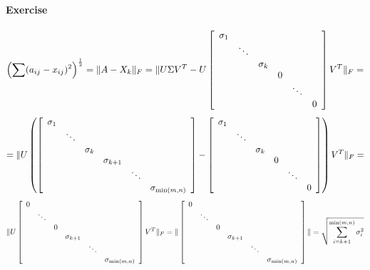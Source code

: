 \documentclass[10pt]{report}
\begin{document}
\paragraph{Exercise}
$$\left(\sum(a_{ij}-x_{ij})^2\right)^{\frac{1}{2}} = \|A-X_k\|_F=\|U\Sigma V^T-U\left[\begin{array}{c c c c c c}
\sigma_1\\
&\ddots\\
&&\sigma_k\\
&&&0\\
&&&&\ddots\\
&&&&&0
\end{array}\right]V^T\|_F=$$
$$=\|U\left(\left[\begin{array}{c c c c c c}
\sigma_1\\
&\ddots\\
&&\sigma_k\\
&&&\sigma_{k+1}\\
&&&&\ddots\\
&&&&&\sigma_{\min(m,n)}
\end{array}\right]-\left[\begin{array}{c c c c c c}
\sigma_1\\
&\ddots\\
&&\sigma_k\\
&&&0\\
&&&&\ddots\\
&&&&&0
\end{array}\right]\right)V^T\|_F=$$
$$\|U\left[\begin{array}{c c c c c c}
0\\
&\ddots\\
&&0\\
&&&\sigma_{k+1}\\
&&&&\ddots\\
&&&&&\sigma_{\min(m,n)}
\end{array}\right]V^T\|_F=\|\left[\begin{array}{c c c c c c}
0\\
&\ddots\\
&&0\\
&&&\sigma_{k+1}\\
&&&&\ddots\\
&&&&&\sigma_{\min(m,n)}
\end{array}\right]\|=\sqrt{\sum_{i=k+1}^{\min(m,n)}\sigma_i^2}$$
\end{document}
